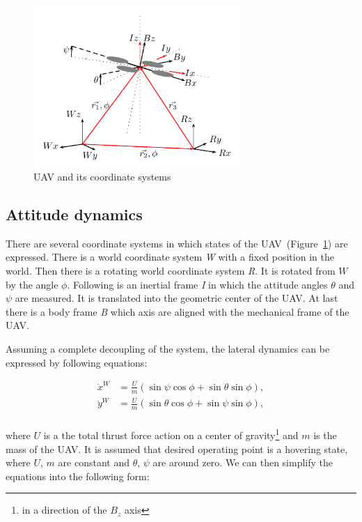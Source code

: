\begin{figure}[!h]
\centering
\includegraphics[width=0.7\textwidth]{fig/coordinate_system.pdf}
\caption{UAV and its coordinate systems}
\label{fig:coordinate_system}
\end{figure}

\subsection{Attitude dynamics}

There are several coordinate systems in which states of the UAV~(Figure~\ref{fig:coordinate_system}) are expressed. There is a world coordinate system \textit{W} with a fixed position in the world. Then there is a rotating world coordinate system \textit{R}. It is rotated from $W$ by the angle $\phi$. Following is an inertial frame \textit{I} in which the attitude angles $\theta$ and $\psi$ are measured. It is translated into the geometric center of the UAV. At last there is a body frame \textit{B} which axis are aligned with the mechanical frame of the UAV.

Assuming a complete decoupling of the system, the lateral dynamics can be expressed by following equations:

\begin{equation}
\begin{split}
\ddot{x}^W &= \frac{U}{m}\left(\sin\psi\cos\phi + \sin\theta\sin\phi\right),\\
\ddot{y}^W &= \frac{U}{m}\left(\sin\theta\cos\phi + \sin\psi\sin\phi\right),\\
\end{split}
\end{equation}

where $U$ is a the total thrust force action on a center of gravity\footnote{in a direction of the $B_z$ axis} and $m$ is the mass of the UAV. It is assumed that desired operating point is a hovering state, where $U$, $m$ are constant and $\theta$, $\psi$ are around zero. We can then simplify the equations into the following form:

